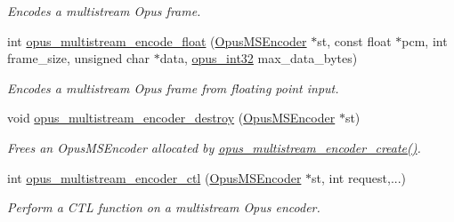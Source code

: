\begin{DoxyCompactItemize}
\begin{DoxyCompactList}\small\item\em Encodes a multistream Opus frame. \item\end{DoxyCompactList}\item 
int \hyperlink{group__opus__multistream_gaff832211e572536941b9d6094f9f42ce}{opus\_\-multistream\_\-encode\_\-float} (\hyperlink{group__opus__multistream_gae5826674d142fc873ebc1d781c507dd7}{OpusMSEncoder} $\ast$st, const float $\ast$pcm, int frame\_\-size, unsigned char $\ast$data, \hyperlink{opus__types_8h_aa4d309d6f80b99dbabebc8f98879ab9a}{opus\_\-int32} max\_\-data\_\-bytes)
\begin{DoxyCompactList}\small\item\em Encodes a multistream Opus frame from floating point input. \item\end{DoxyCompactList}\item 
void \hyperlink{group__opus__multistream_gaec819b8d4b38350aba6959cee7d33f94}{opus\_\-multistream\_\-encoder\_\-destroy} (\hyperlink{group__opus__multistream_gae5826674d142fc873ebc1d781c507dd7}{OpusMSEncoder} $\ast$st)
\begin{DoxyCompactList}\small\item\em Frees an {\ttfamily OpusMSEncoder} allocated by \hyperlink{group__opus__multistream_gaeb64c648ed8155f824ca8d9a93ccecae}{opus\_\-multistream\_\-encoder\_\-create()}. \item\end{DoxyCompactList}\item 
int \hyperlink{group__opus__multistream_gae14328330c548dede66c494f51e33707}{opus\_\-multistream\_\-encoder\_\-ctl} (\hyperlink{group__opus__multistream_gae5826674d142fc873ebc1d781c507dd7}{OpusMSEncoder} $\ast$st, int request,...)
\begin{DoxyCompactList}\small\item\em Perform a CTL function on a multistream Opus encoder. \item\end{DoxyCompactList}\end{DoxyCompactItemize}
